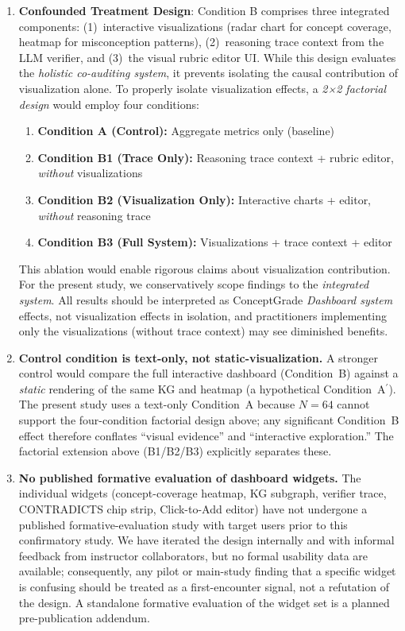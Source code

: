 \documentclass[journal,review]{vgtc}
\begin{document}
\begin{enumerate}
  \item \textbf{Confounded Treatment Design}: Condition B comprises three integrated components: (1)~interactive visualizations (radar chart for concept coverage, heatmap for misconception patterns), (2)~reasoning trace context from the LLM verifier, and (3)~the visual rubric editor UI. While this design evaluates the \emph{holistic co-auditing system}, it prevents isolating the causal contribution of visualization alone. To properly isolate visualization effects, a \textit{2×2 factorial design} would employ four conditions:
  \begin{enumerate}
    \item[] \textbf{Condition A (Control):} Aggregate metrics only (baseline)
    \item[] \textbf{Condition B1 (Trace Only):} Reasoning trace context + rubric editor, \emph{without} visualizations
    \item[] \textbf{Condition B2 (Visualization Only):} Interactive charts + editor, \emph{without} reasoning trace
    \item[] \textbf{Condition B3 (Full System):} Visualizations + trace context + editor
  \end{enumerate}
  This ablation would enable rigorous claims about visualization contribution. For the present study, we conservatively scope findings to the \emph{integrated system}. All results should be interpreted as ConceptGrade \emph{Dashboard system} effects, not visualization effects in isolation, and practitioners implementing only the visualizations (without trace context) may see diminished benefits.

  \item \textbf{Control condition is text-only, not static-visualization.} A stronger control would compare the full interactive dashboard (Condition~B) against a \emph{static} rendering of the same KG and heatmap (a hypothetical Condition~A$^\prime$). The present study uses a text-only Condition~A because $N = 64$ cannot support the four-condition factorial design above; any significant Condition~B effect therefore conflates ``visual evidence'' and ``interactive exploration.'' The factorial extension above (B1/B2/B3) explicitly separates these.

  \item \textbf{No published formative evaluation of dashboard widgets.} The individual widgets (concept-coverage heatmap, KG subgraph, verifier trace, CONTRADICTS chip strip, Click-to-Add editor) have not undergone a published formative-evaluation study with target users prior to this confirmatory study. We have iterated the design internally and with informal feedback from instructor collaborators, but no formal usability data are available; consequently, any pilot or main-study finding that a specific widget is confusing should be treated as a first-encounter signal, not a refutation of the design. A standalone formative evaluation of the widget set is a planned pre-publication addendum.


\end{enumerate}
\end{document}
